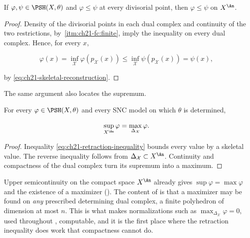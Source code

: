 \begin{proposition}\label{prop:ch21-divisorial-order}
If \(\varphi,\psi\in\PSH(X,\theta)\) and
\(\varphi\leq\psi\) at every divisorial point, then
\(\varphi\leq\psi\) on \(X^{\An}\).
\end{proposition}

\begin{proof}
Density of the divisorial points in each dual complex and continuity of the
two restrictions, by
\,\cref{itm:ch21-fc:finite}, imply the
inequality on every dual complex.  Hence,
for every \(x\),

\[
 \varphi(x)
 =\inf_{\mathcal X}\varphi(p_{\mathcal X}(x))
 \leq\inf_{\mathcal X}\psi(p_{\mathcal X}(x))
 =\psi(x),
\]

by \eqref{eq:ch21-skeletal-reconstruction}.
\end{proof}

The same argument also locates the supremum.

\begin{proposition}\label{prop:ch21-sup-on-skeleton}
For every \(\varphi\in\PSH(X,\theta)\) and every SNC model on which
\(\theta\) is determined,

\begin{equation}
\label{eq:ch21-sup-on-skeleton}
             \sup_{X^{\An}}\varphi
             =\max_{\Delta_{\mathcal X}}\varphi.
\end{equation}
\end{proposition}

\begin{proof}
Inequality \eqref{eq:ch21-retraction-inequality} bounds every value by a
skeletal value.  The reverse inequality follows from
\(\Delta_{\mathcal X}\subset X^{\An}\).  Continuity and compactness of the
dual complex turn its supremum into a maximum.
\end{proof}

\begin{remark}
\label{rem:ch21-sup-sharper}
Upper semicontinuity on the compact space \(X^{\An}\) already gives
\(\sup\varphi=\max\varphi\) and the existence of a maximizer
().  The content of
 is that a maximizer may be found on
\emph{any} prescribed determining dual complex, a finite polyhedron of
dimension at most \(n\).  This is what makes normalizations such as
\(\max_{\Delta_{\mathcal X}}\varphi=0\), used throughout
, computable, and it is the first place where the
retraction inequality does work that compactness cannot do.
\end{remark}

